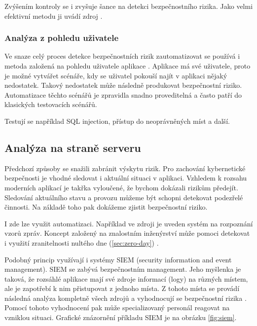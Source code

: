 \documentclass[thesis=M,czech]{FITthesis}[2012/10/20]
\begin{document}
			Zvýšením kontroly se i zvyšuje šance na detekci bezpečnostního rizika. Jako velmi efektivní metodu ji uvádí zdroj \cite{pethukovKozlovVulnerabilities}.
			
			\subsubsection{Analýza z pohledu uživatele}
				Ve snaze celý proces detekce bezpečnostních rizik zautomatizovat se používá i metoda založená na pohledu uživatele aplikace \cite{pethukovKozlovVulnerabilities}. Aplikace má své uživatele, proto je možné vytvářet scénáře, kdy se uživatel pokouší najít v aplikaci nějaký nedostatek. Takový nedostatek může následně produkovat bezpečnostní riziko. Automatizace těchto scénářů je zpravidla snadno proveditelná a často patří do klasických testovacích scénářů.
				
				Testují se například SQL injection, přístup do neoprávněných míst a další.
				
			\subsection{Analýza na straně serveru}
				Předchozí způsoby se snažili zabránit výskytu rizik. Pro zachování kybernetické bezpečnosti je vhodné sledovat i aktuální situaci v aplikaci. Vzhledem k rozsahu moderních aplikací je takřka vyloučené, že bychom dokázali rizikům předejít. Sledování aktuálního stavu a provozu můžeme být schopni detekovat podezřelé činnosti. Na základě toho pak dokážeme zjistit bezpečnostní riziko.
				
				I zde lze využit automatizaci. Například ve zdroji \cite{CoronaGiacintoDetWebAtt} je uveden systém na rozpoznání vzorů zpráv. Koncept založený na znalostním inženýrství může pomoci detekovat i využití zranitelnosti nultého dne (\ref{sec:zero-day}) \cite{AhnKimChungBigDataAnal}.
				
				Podobný princip využívají i systémy SIEM (security information and event management). SIEM se zabývá bezpečnostním management. Jeho myšlenka je taková, že  
				rozsáhlé aplikace mají své zdroje informací (logy) na různých místem, ale je zapotřebí k nim přistupovat z jednoho místa. Z tohoto místa se provádí následná analýza kompletně všech zdrojů a vyhodnocují se bezpečnostní rizika \cite{SIEMDef}. Pomocí tohoto vyhodnocení pak může specializovaný personál reagovat na vzniklou situaci. Grafické znázornění příkladu SIEM je na obrázku \ref{fig:siem}.
				
\end{document}

